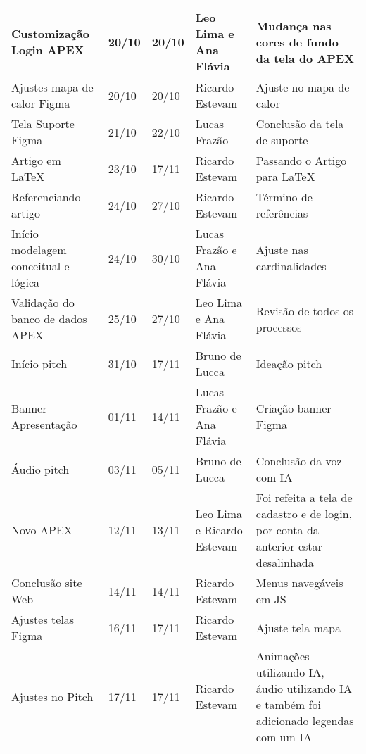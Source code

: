 \documentclass[
landscape,
  a4paper,%
  12pt,%
  english,%
  brazilian,%
]{article}
\begin{document}
\begin{table}[]
{\begin{tabular}{|l|l|l|l|l|}
Customização Login APEX             & 20/10 & 20/10 & Leo Lima e Ana Flávia & Mudança nas cores de fundo da tela do APEX \\ \hline
Ajustes mapa de calor Figma         & 20/10 & 20/10 & Ricardo Estevam & Ajuste no mapa de calor \\ \hline
Tela Suporte Figma                  & 21/10 & 22/10 & Lucas Frazão & Conclusão da tela de suporte \\ \hline
Artigo em LaTeX                     & 23/10 & 17/11 & Ricardo Estevam & Passando o Artigo para LaTeX \\ \hline
Referenciando artigo                & 24/10 & 27/10 & Ricardo Estevam & Término de referências \\ \hline
Início modelagem conceitual e lógica& 24/10 & 30/10 & Lucas Frazão e Ana Flávia & Ajuste nas cardinalidades \\ \hline
Validação do banco de dados APEX    & 25/10 & 27/10 & Leo Lima e Ana Flávia & Revisão de todos os processos \\ \hline
Início pitch                        & 31/10 & 17/11 & Bruno de Lucca & Ideação pitch \\ \hline
Banner Apresentação                 & 01/11 & 14/11 & Lucas Frazão e Ana Flávia & Criação banner Figma \\ \hline
Áudio pitch                         & 03/11 & 05/11 & Bruno de Lucca & Conclusão da voz com IA \\ \hline
Novo APEX                           & 12/11 & 13/11 & Leo Lima e Ricardo Estevam & Foi refeita a tela de cadastro e de login, por conta da anterior estar desalinhada \\ \hline
Conclusão site Web                  & 14/11 & 14/11 & Ricardo Estevam & Menus navegáveis em JS \\ \hline
Ajustes telas Figma                 & 16/11 & 17/11 & Ricardo Estevam & Ajuste tela mapa\\ \hline
Ajustes no Pitch                    & 17/11 & 17/11 & Ricardo Estevam & Animações utilizando IA, áudio utilizando IA e também foi adicionado legendas com um IA\\ \hline
\end{tabular}
}
\end{table}
\end{document}
